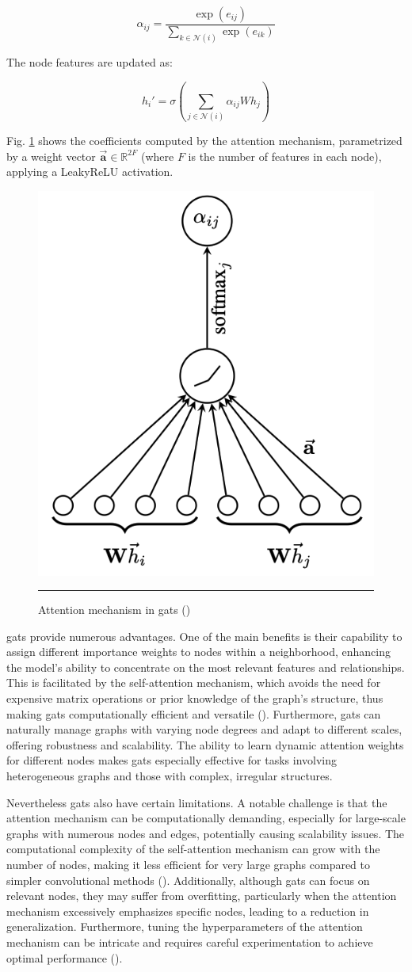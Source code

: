 \[ \alpha_{ij} = \frac{\exp(e_{ij})}{\sum_{k \in \mathcal{N}(i)} \exp(e_{ik})} \]

The node features are updated as:

\[ h_i' = \sigma\left(\sum_{j \in \mathcal{N}(i)} \alpha_{ij} W h_j\right) \]

Fig. \ref{fig:gat-attention-mechanism} shows the coefficients computed by the attention mechanism, parametrized by a weight vector $\vec{\mathbf{a}} \in \mathbb{R}^{2F}$ (where $F$ is the number of features in each node), applying a LeakyReLU activation.
\begin{figure}[htbp]
    \centering
 \includegraphics[width=.3\textwidth]{03_Figures/literature-review/gat-attention-mechanism.png}
     \rule{35em}{0.5pt}
    \caption{Attention mechanism in \glspl{gat} (\cite{Velickovic2018})} 
 \label{fig:gat-attention-mechanism}
\end{figure}


\glspl{gat} provide numerous advantages.
One of the main benefits is their capability to assign different importance weights to nodes within a neighborhood, enhancing the model's ability to concentrate on the most relevant features and relationships.
This is facilitated by the self-attention mechanism, which avoids the need for expensive matrix operations or prior knowledge of the graph's structure, thus making \glspl{gat} computationally efficient and versatile (\cite{Velickovic2018}).
Furthermore, \glspl{gat} can naturally manage graphs with varying node degrees and adapt to different scales, offering robustness and scalability.
The ability to learn dynamic attention weights for different nodes makes \glspl{gat} especially effective for tasks involving heterogeneous graphs and those with complex, irregular structures.

Nevertheless \glspl{gat} also have certain limitations.
A notable challenge is that the attention mechanism can be computationally demanding, especially for large-scale graphs with numerous nodes and edges, potentially causing scalability issues.
The computational complexity of the self-attention mechanism can grow with the number of nodes, making it less efficient for very large graphs compared to simpler convolutional methods (\cite{Thekumparampil2018}).
Additionally, although \glspl{gat} can focus on relevant nodes, they may suffer from overfitting, particularly when the attention mechanism excessively emphasizes specific nodes, leading to a reduction in generalization.
Furthermore, tuning the hyperparameters of the attention mechanism can be intricate and requires careful experimentation to achieve optimal performance (\cite{Lee2018}).

